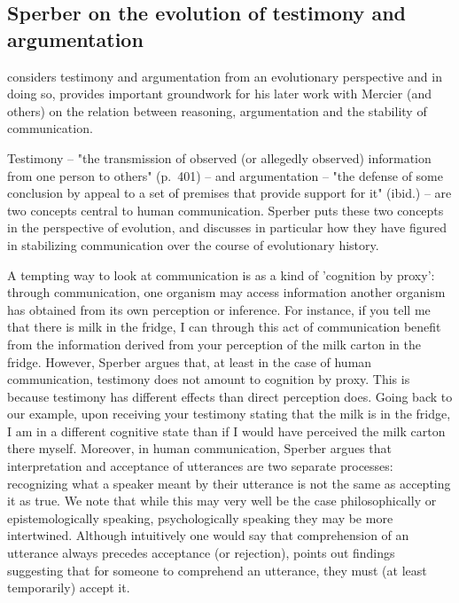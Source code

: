 \subsection{Sperber on the evolution of testimony and argumentation}
\label{sec:Sperber01}

\citet{Sperber01} considers testimony and argumentation from an evolutionary perspective and in doing so, provides important groundwork for his later work with Mercier (and others) on the relation between reasoning, argumentation and the stability of communication.

Testimony -- "the transmission of observed (or allegedly observed) information from one person to others" (p.~401) -- and argumentation -- "the defense of some conclusion by appeal to a set of premises that provide support for it" (ibid.) -- are two concepts central to human communication.
Sperber puts these two concepts in the perspective of evolution, and discusses in particular how they have figured in stabilizing communication over the course of evolutionary history.

A tempting way to look at communication is as a kind of 'cognition by proxy': through communication, one organism may access information another organism has obtained from its own perception or inference. For instance, if you tell me that there is milk in the fridge, I can through this act of communication benefit from the information derived from your perception of the milk carton in the fridge.
However, Sperber argues that, at least in the case of human communication, testimony does not amount to cognition by proxy. This is because testimony has different effects than direct perception does. Going back to our example, upon receiving your testimony stating that the milk is in the fridge, I am in a different cognitive state than if I would have perceived the milk carton there myself. Moreover, in human communication, Sperber argues that interpretation and acceptance of utterances are two separate processes: recognizing what a speaker meant by their utterance is not the same as accepting it as true.
We note that while this may very well be the case philosophically or epistemologically speaking, psychologically speaking they may be more intertwined. Although intuitively one would say that comprehension of an utterance always precedes acceptance (or rejection), \citet{Lewandowsky12} points out findings suggesting that for someone to comprehend an utterance, they must (at least temporarily) accept it.

